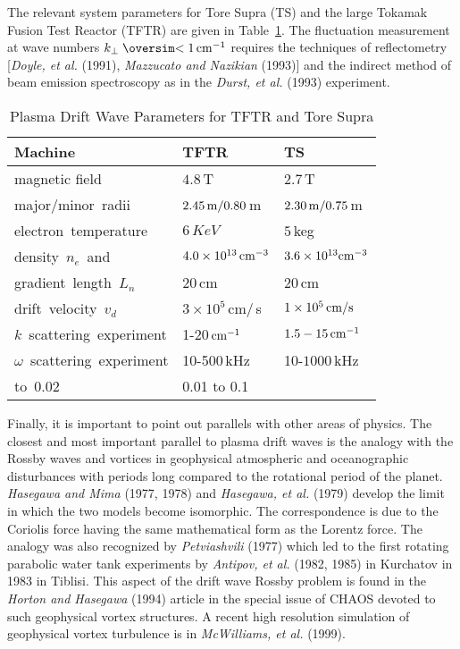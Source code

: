 \documentclass[a4paper,openany,12pt]{book}
\def\nms{\mathsurround=0pt}
\def\ltsim{\mathrel{\mathpalette\oversim<}} %
\def\oversim#1#2{\lower 2pt\vbox{\baselineskip 0pt \lineskip 1pt
    \ialign{$\nms#1\hfil##\hfil$\crcr#2\crcr\sim\crcr}}}
\begin{document}
The relevant system parameters for Tore Supra (TS) and the large Tokamak Fusion Test Reactor (TFTR) are given in Table~\ref{T9.2}. The fluctuation measurement at wave numbers $k_\perp\ltsim 1\,\rm cm^{-1}$ requires the techniques of reflectometry [\emph{Doyle, et al.} (1991), \emph{Mazzucato and Nazikian} (1993)] and the indirect method of beam emission spectroscopy as in the \emph{Durst, et al.} (1993) experiment. 
%
\begin{table}[H]
\begin{center}
\caption{Plasma Drift Wave Parameters for TFTR and Tore Supra}
\begin{tabular}{p{2in}ll}\\\hline\hline
Machine	&TFTR    &TS \\\hline
magnetic field    &$4.8\,$T	&$2.7\,$T\\
\mbox{major/minor radii}  &$2.45\,\rm m/0.80\,$m   &$2.30\,\rm m/0.75\,$m\\	
\mbox{electron temperature}   &$6\,KeV$   &$5\,$keg\\	
\mbox{density $n_e$ and}	&$4.0\times 10^{13}\,\rm cm^{-3}$   &$3.6\times 10^{13}\rm cm^{-3}$\\	
\mbox{gradient length $L_n$}   &$20\,$cm   &$20\,$cm\\	
\mbox{drift velocity $v_d$}   &$3\times 10^5\,$cm/\,s   &$1\times 10^5\,\rm cm/s$\\	
\mbox{$k$ scattering experiment}   &1-20$\,\rm cm^{-1}$  &$1.5-15\,\rm cm^{-1}$\\	
\mbox{$\omega$ scattering experiment}  &10-500$\,$kHz    &10-$1000\,$kHz\\	
\mbox{to 0.02}	&0.01 to 0.1 &\\\hline\hline
\end{tabular}
\label{T9.2}
\end{center}
\end{table}
%
Finally, it is important to point out parallels with other areas of physics. The closest and most important parallel to plasma drift waves is the analogy with the Rossby waves and vortices in geophysical atmospheric and oceanographic disturbances with periods long compared to the rotational period of the planet. \emph{Hasegawa and Mima} (1977, 1978) and \emph{Hasegawa, et al.} (1979) develop the limit in which the two models become isomorphic. The correspondence is due to the Coriolis force having the same mathematical form as the Lorentz force. The analogy was also recognized by \emph{Petviashvili} (1977) which led to the first rotating parabolic water tank experiments by \emph{Antipov, et al.} (1982, 1985) in Kurchatov in 1983 in Tiblisi. This aspect of the drift wave Rossby problem is found in the \emph{Horton and Hasegawa} (1994) article in the special issue of CHAOS devoted to such geophysical vortex structures. A recent high resolution simulation of geophysical vortex turbulence is in \emph{McWilliams, et al.} (1999).
\end{document}
